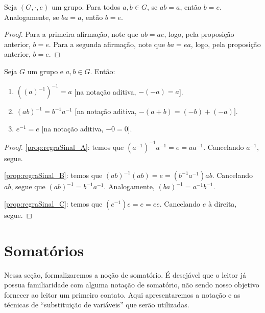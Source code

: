 \begin{corol}[Cancelamento II]\label{prop:group_cancelII}
    Seja $(G,\cdot,e)$ um grupo.
    Para todos $a, b \in G$, se $ab=a$, então $b=e$.
Analogamente, se $ba=a$, então $b=e$.
\end{corol}
\begin{proof}
    Para a primeira afirmação, note que $ab=ae$, logo, pela proposição anterior, $b=e$.
    Para a segunda afirmação, note que $ba=ea$, logo, pela proposição anterior, $b=e$.
\end{proof}

\begin{prop}\label{prop:regraSinal}
    Seja $G$ um grupo e $a, b \in G$.
    Então:
    \begin{enumerate}[label=\alph*)]
        \item $((a)^{-1})^{-1}=a$ [na notação aditiva, $-(-a)=a$].
\label{prop:regraSinal_A}
        \item $(ab)^{-1}=b^{-1}a^{-1}$ [na notação aditiva, $-(a+b)=(-b)+(-a)]$.\label{prop:regraSinal_B}
        \item $e^{-1}=e$ [na notação aditiva, $-0=0$].\label{prop:regraSinal_C}
    \end{enumerate}
\end{prop}
\begin{proof}
    \ref{prop:regraSinal_A}: temos que $(a^{-1})^{-1}a^{-1}=e=aa^{-1}$.
    Cancelando $a^{-1}$, segue.
    
    \ref{prop:regraSinal_B}: temos que $(ab)^{-1}(ab)=e=(b^{-1}a^{-1})ab$.
    Cancelando $ab$, segue que $(ab)^{-1}=b^{-1}a^{-1}$.
    Analogamente, $(ba)^{-1}=a^{-1}b^{-1}$.

    \ref{prop:regraSinal_C}: temos que $(e^{-1})e=e=ee$.
    Cancelando $e$ à direita, segue.


\end{proof}

\section{Somatórios}

Nessa seção, formalizaremos a noção de somatório.
É desejável que o leitor já possua familiaridade com alguma notação de somatório, não sendo nosso objetivo fornecer ao leitor um primeiro contato. Aqui apresentaremos a notação e as técnicas de ``substituição de variáveis'' que serão utilizadas.

